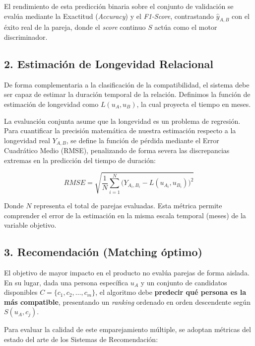 El rendimiento de esta predicción binaria sobre el conjunto de validación se evalúa mediante la Exactitud (\textit{Accuracy}) y el \textit{F1-Score}, contrastando $\hat{y}_{A,B}$ con el éxito real de la pareja, donde el \textit{score} continuo $S$ actúa como el motor discriminador.

\subsection{2. Estimación de Longevidad Relacional}
De forma complementaria a la clasificación de la compatibilidad, el sistema debe ser capaz de estimar la duración temporal de la relación. Definimos la función de estimación de longevidad como $L(u_A, u_B)$, la cual proyecta el tiempo en meses.

La evaluación conjunta asume que la longevidad es un problema de regresión. Para cuantificar la precisión matemática de nuestra estimación respecto a la longevidad real $Y_{A,B}$, se define la función de pérdida mediante el Error Cuadrático Medio (RMSE), penalizando de forma severa las discrepancias extremas en la predicción del tiempo de duración:

\begin{equation}
    RMSE = \sqrt{\frac{1}{N} \sum_{i=1}^{N} \Big(Y_{A_i,B_i} - L(u_{A_i}, u_{B_i})\Big)^2}
\end{equation}

Donde $N$ representa el total de parejas evaluadas. Esta métrica permite comprender el error de la estimación en la misma escala temporal (meses) de la variable objetivo.

\subsection{3. Recomendación (Matching óptimo)}
El objetivo de mayor impacto en el producto no evalúa parejas de forma aislada. En su lugar, dada una persona específica $u_A$ y un conjunto de candidatos disponibles $C = \{c_1, c_2, \dots, c_m\}$, el algoritmo debe \textbf{predecir qué persona es la más compatible}, presentando un \textit{ranking} ordenado en orden descendente según $S(u_A, c_j)$. 

Para evaluar la calidad de este emparejamiento múltiple, se adoptan métricas del estado del arte de los Sistemas de Recomendación:

